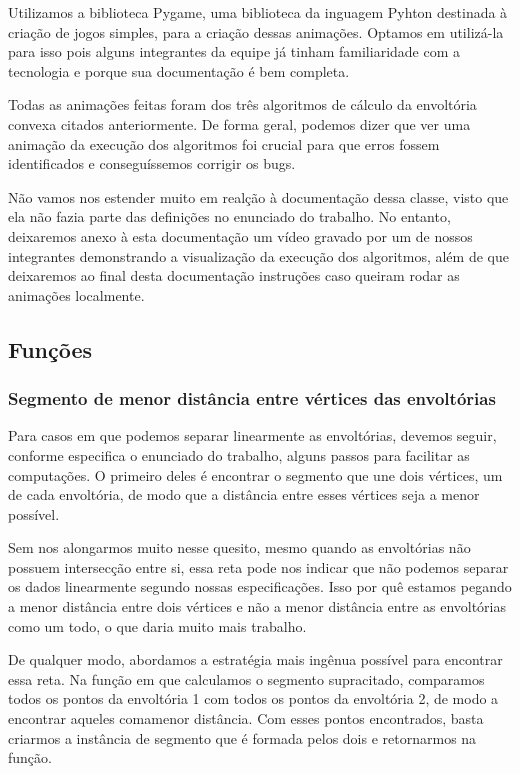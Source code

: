 \documentclass{article}
\begin{document}
Utilizamos a biblioteca Pygame, uma biblioteca da inguagem Pyhton destinada à criação de jogos simples, para a criação dessas animações. Optamos em utilizá-la para isso pois alguns integrantes da equipe já tinham familiaridade com a tecnologia e porque sua documentação é bem completa.

Todas as animações feitas foram dos três algoritmos de cálculo da envoltória convexa citados anteriormente. De forma geral, podemos dizer que ver uma animação da execução dos algoritmos foi crucial para que erros fossem identificados e conseguíssemos corrigir os bugs. 

Não vamos nos estender muito em realção à documentação dessa classe, visto que ela não fazia parte das definições no enunciado do trabalho. No entanto, deixaremos anexo à esta documentação um vídeo gravado por um de nossos integrantes demonstrando a visualização da execução dos algoritmos, além de que deixaremos ao final desta documentação instruções caso queiram rodar as animações localmente.

\subsection{Funções}

\subsubsection{Segmento de menor distância entre vértices das envoltórias}

Para casos em que podemos separar linearmente as envoltórias, devemos seguir, conforme especifica o enunciado do trabalho, alguns passos para facilitar as computações. O primeiro deles é encontrar o segmento que une dois vértices, um de cada envoltória, de modo que a distância entre esses vértices seja a menor possível.

Sem nos alongarmos muito nesse quesito, mesmo quando as envoltórias não possuem intersecção entre si, essa reta pode nos indicar que não podemos separar os dados linearmente segundo nossas especificações. Isso por quê estamos pegando a menor distância entre dois vértices e não a menor distância entre as envoltórias como um todo, o que daria muito mais trabalho.

De qualquer modo, abordamos a estratégia mais ingênua possível para encontrar essa reta. Na função em que calculamos o segmento supracitado, comparamos todos os pontos da envoltória 1 com todos os pontos da envoltória 2, de modo a encontrar aqueles comamenor distância. Com esses pontos encontrados, basta criarmos a instância de segmento que é formada pelos dois e retornarmos na função.
\end{document}
